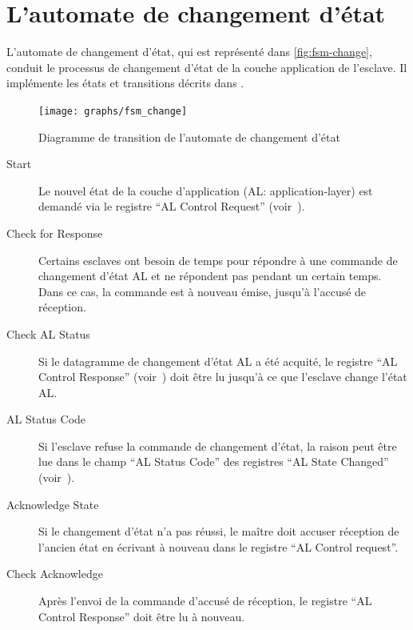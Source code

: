 \documentclass[a4paper,12pt,BCOR=6mm,bibtotoc,idxtotoc]{scrbook}
\begin{document}

\section{L'automate de changement d'\'etat}
\label{sec:fsm-change}

L'automate de changement d'\'etat, qui est repr\'esent\'e dans
\autoref{fig:fsm-change}, conduit le processus de changement d'\'etat de
la couche application de l'esclave. Il impl\'emente les \'etats et
transitions d\'ecrits dans \cite[sec.~6.4.1]{alspec}.

\begin{figure}[htbp]
  \centering
  \texttt{[image: graphs/fsm\_change]}
  \caption{Diagramme de transition de l'automate de changement d'\'etat}
  \label{fig:fsm-change}
\end{figure}

\begin{description}

\item[Start] Le nouvel \'etat de la couche d'application (AL:
  application-layer) est demand\'e via le registre ``AL Control
  Request'' (voir~\cite[sec. 5.3.1]{alspec}).

\item[Check for Response] Certains esclaves ont besoin de temps pour
  r\'epondre \`a une commande de changement d'\'etat AL et ne
  r\'epondent pas pendant un certain temps. Dans ce cas, la commande
  est \`a nouveau \'emise, jusqu'\`a l'accus\'e de r\'eception.

\item[Check AL Status] Si le datagramme de changement d'\'etat AL a
  \'et\'e acquit\'e, le registre ``AL Control Response''
  (voir~\cite[sec. 5.3.2]{alspec}) doit \^etre lu jusqu'\`a ce que
  l'esclave change l'\'etat AL.

\item[AL Status Code] Si l'esclave refuse la commande de changement
  d'\'etat, la raison peut \^etre lue dans le champ ``AL Status Code''
  des registres ``AL State Changed'' (voir~\cite[sec. 5.3.3]{alspec}).

\item[Acknowledge State] Si le changement d'\'etat n'a pas r\'eussi,
  le ma\^itre doit accuser r\'eception de l'ancien \'etat en
  \'ecrivant \`a nouveau dans le registre ``AL Control request''.


\item[Check Acknowledge] Apr\`es l'envoi de la commande d'accus\'e de
  r\'eception, le registre ``AL Control Response'' doit \^etre lu \`a
  nouveau.

\end{description}
\end{document}
